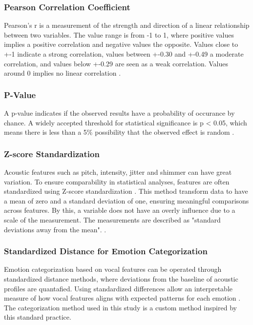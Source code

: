 \subsubsection{Pearson Correlation Coefficient}
Pearson's r is a measurement of the strength and direction of a linear relationship between two variables. The value range is from -1 to 1, where positive values implies a positive correlation and negative values the opposite.
Values close to +-1 indicate a strong correlation, values between +-0.30 and +-0.49 a moderate correlation, and values 
below +-0.29 are seen as a weak correlation. Values around 0 implies no linear correlation \autocite{Bruce2017}.

\subsubsection{P-Value}
A p-value indicates if the observed results have a probability of occurance by chance. A widely accepted threshold for statistical significance 
is p < 0.05, which means there is less than a 5\% possibility that the observed effect is random \autocite{Bruce2017}. 

\subsubsection{Z-score Standardization}
Acoustic features such as pitch, intensity, jitter and shimmer can have great variation. To ensure comparability in statistical analyses, features are often standardized using Z-score standardization \autocite{Ekberg2023}.
This method transform data to have a mean of zero and a standard deviation of one, ensuring meaningful comparisons across features. By this, a variable does not have an overly influence due to a scale of the measurement. 
The measurements are described as "standard deviations away from the mean". \autocite{Bruce2017}. 

\subsubsection{Standardized Distance for Emotion Categorization}
Emotion categorization based on vocal features can be operated through standardized distance methods, where deviations from the baseline of acoustic profiles are quantafied. Using standardized differences allow an interpretable measure of how vocal features aligns with expected patterns for each emotion \autocite{Ekberg2023} \autocite{Bruce2017}. 
The categorization method used in this study is a custom method inspired by this standard practice. 

